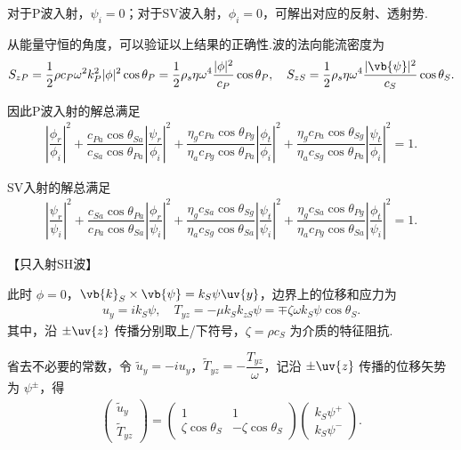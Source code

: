 对于P波入射，\(\psi_i = 0\)；对于SV波入射，\(\phi_i = 0\)，可解出对应的反射、透射势.

从能量守恒的角度，可以验证以上结果的正确性.波的法向能流密度为
\begin{align*}
	S_{zP} = \dfrac{1}{2} \rho c_P \omega^2 k_P^2 |\phi|^2 \cos\theta_P = \dfrac{1}{2} \rho_s \eta \omega^4 \dfrac{|\phi|^2}{c_P} \cos\theta_P, \quad S_{zS} = \dfrac{1}{2} \rho_s \eta \omega^4 \dfrac{|\vb{\psi}|^2}{c_S} \cos\theta_S.
\end{align*}

因此P波入射的解总满足
\begin{align*}
	\left| \dfrac{\phi_r}{\phi_i} \right|^2 + \dfrac{c_{Pa} \cos\theta_{Sa}}{c_{Sa} \cos\theta_{Pa}} \left| \dfrac{\psi_r}{\phi_i} \right|^2 + \dfrac{\eta_g c_{Pa} \cos\theta_{Pg}}{\eta_a c_{Pg} \cos\theta_{Pa}} \left| \dfrac{\phi_t}{\phi_i} \right|^2 + \dfrac{\eta_g c_{Pa} \cos\theta_{Sg}}{\eta_a c_{Sg} \cos\theta_{Pa}} \left| \dfrac{\psi_t}{\phi_i} \right|^2 = 1.
\end{align*}

SV入射的解总满足
\begin{align*}
	\left| \dfrac{\psi_r}{\psi_i} \right|^2 + \dfrac{c_{Sa} \cos\theta_{Pa}}{c_{Pa} \cos\theta_{Sa}} \left| \dfrac{\phi_r}{\psi_i} \right|^2 + \dfrac{\eta_g c_{Sa} \cos\theta_{Sg}}{\eta_a c_{Sg} \cos\theta_{Sa}} \left| \dfrac{\psi_t}{\psi_i} \right|^2 + \dfrac{\eta_g c_{Sa} \cos\theta_{Pg}}{\eta_a c_{Pg} \cos\theta_{Sa}} \left| \dfrac{\phi_t}{\psi_i} \right|^2 = 1.
\end{align*}


【只入射SH波】

此时 \(\phi = 0\)，\(\vb{k}_S \times \vb{\psi} = k_S \psi \uv{y}\)，边界上的位移和应力为
\begin{align*}
	u_y = i k_S \psi, \quad T_{yz} = -\mu k_S k_{zS} \psi = \mp \zeta \omega k_S \psi \cos\theta_S.
\end{align*}
其中，沿 \(\pm \uv{z}\) 传播分别取上/下符号，\(\zeta = \rho c_S\) 为介质的特征阻抗.

省去不必要的常数，令 \(\tilde{u}_y = -i u_y\)，\(\tilde{T}_{yz} = -\dfrac{T_{yz}}{\omega}\)，记沿 \(\pm \uv{z}\) 传播的位移矢势为 \(\psi^\pm\)，得
\begin{align*}
	\begin{pmatrix} \tilde{u}_y \\ \tilde{T}_{yz} \end{pmatrix} =
	\begin{pmatrix} 1 & 1 \\ \zeta \cos\theta_S & -\zeta \cos\theta_S \end{pmatrix}
	\begin{pmatrix} k_S \psi^+ \\ k_S \psi^- \end{pmatrix}.
\end{align*}

